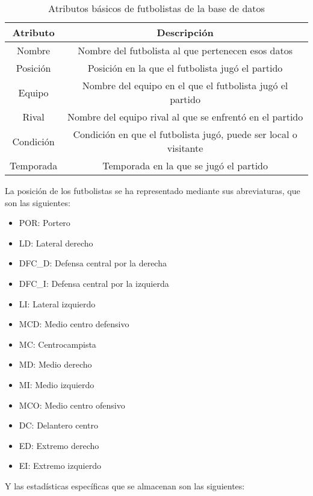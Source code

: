 \begin{table}[H]
    \centering
    \begin{tabular}{|c|c|}
        \hline
        \textbf{Atributo} & \textbf{Descripción} \\
        \hline
        Nombre & Nombre del futbolista al que pertenecen esos datos \\
        \hline
        Posición & Posición en la que el futbolista jugó el partido \\
        \hline
        Equipo & Nombre del equipo en el que el futbolista jugó el partido \\
        \hline
        Rival & Nombre del equipo rival al que se enfrentó en el partido \\
        \hline
        Condición & Condición en que el futbolista jugó, puede ser local o visitante \\
        \hline
        Temporada & Temporada en la que se jugó el partido \\
        \hline
    \end{tabular}
    \caption{Atributos básicos de futbolistas de la base de datos}
    \label{tab:ejemplo}
\end{table}

La posición de los futbolistas se ha representado mediante sus abreviaturas, que son las siguientes:
\begin{itemize}
    \item POR: Portero
    \item LD: Lateral derecho
    \item DFC\_D: Defensa central por la derecha
    \item DFC\_I: Defensa central por la izquierda
    \item LI: Lateral izquierdo
    \item MCD: Medio centro defensivo
    \item MC: Centrocampista
    \item MD: Medio derecho
    \item MI: Medio izquierdo
    \item MCO: Medio centro ofensivo
    \item DC: Delantero centro
    \item ED: Extremo derecho
    \item EI: Extremo izquierdo
\end{itemize}

Y las estadísticas específicas que se almacenan son las siguientes:

